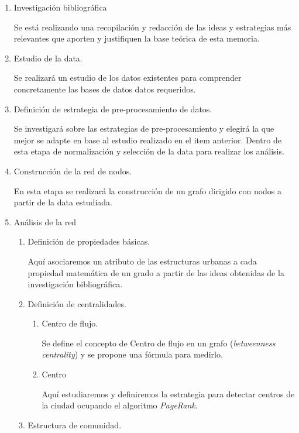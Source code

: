 \documentclass[12pt]{article}
\begin{document}
    \begin{enumerate}
    \item Investigación bibliográfica

    Se está realizando una recopilación y redacción de las ideas y estrategias más relevantes que aporten y justifiquen la base teórica de esta memoria.

    \item Estudio de la data.

    Se realizará un estudio de los datos existentes para comprender concretamente las bases de datos datos requeridos.  

    \item Definición de estrategia de pre-procesamiento de datos.

    Se investigará sobre las estrategias de pre-procesamiento y elegirá la que mejor se adapte en base al estudio realizado en el item anterior. Dentro de esta etapa de normalización y selección de la data para realizar los análisis.

    \item Construcción de la red de nodos.

    En esta etapa se realizará la construcción de un grafo dirigido con nodos a partir de la data estudiada.

    \item Análisis de la red
    \begin{enumerate}
    \item Definición de propiedades básicas.

    Aquí asociaremos un atributo de las estructuras urbanas a cada propiedad matemática de un grado a partir de las ideas obtenidas de la investigación bibliográfica.

    \item Definición de centralidades.
    \begin{enumerate}
    \item Centro de flujo.

    Se define el concepto de Centro de flujo en un grafo (\textit{betweenness centrality}) y se propone una fórmula para medirlo.

    \item Centro

    Aquí estudiaremos y definiremos la estrategia para detectar centros de la ciudad ocupando el algoritmo \textit{PageRank}.

    \end{enumerate}
    \item Estructura de comunidad.


\end{enumerate}
\end{enumerate}
\end{document}
